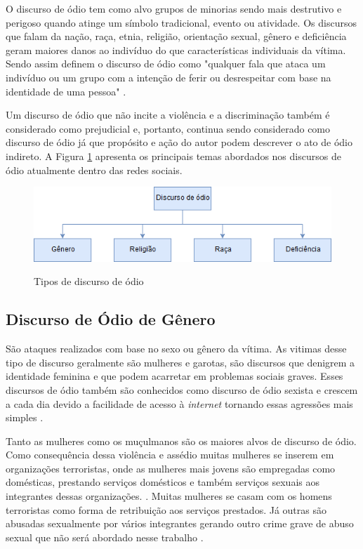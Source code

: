 O discurso de ódio tem como alvo grupos de minorias sendo mais destrutivo e perigoso quando atinge um símbolo tradicional, evento ou atividade. Os discursos que falam da nação, raça, etnia, religião, orientação sexual, gênero e deficiência geram maiores danos ao indivíduo do que características individuais da vítima. Sendo assim  definem o discurso de ódio como "qualquer fala que ataca um indivíduo ou um grupo com a intenção de ferir ou desrespeitar com base na identidade de uma pessoa" \cite{Chetty2018}.

Um discurso de ódio que não incite a violência e a discriminação também é considerado como prejudicial e, portanto, continua sendo considerado como discurso de ódio já que propósito e ação do autor podem descrever o ato de ódio indireto. A Figura \ref{fig:tiposdediscursodeodio} apresenta os principais temas abordados nos discursos de ódio atualmente dentro das redes sociais.

\begin{figure}[!h]
\centering 
\caption{Tipos de discurso de ódio}
\includegraphics[scale=0.70]{imagens/tiposdediscursodeodio.png}
\label{fig:tiposdediscursodeodio}
\end{figure}

\subsection{Discurso de Ódio de Gênero}
São ataques realizados com base no sexo ou gênero da vítima. As vitimas desse tipo de discurso geralmente são mulheres e garotas, são discursos que denigrem a identidade feminina e que podem acarretar em problemas sociais graves. Esses discursos de ódio também são conhecidos como discurso de ódio sexista e crescem a cada dia devido a facilidade de acesso à \textit{internet} tornando essas agressões mais simples \cite{Chetty2018}.

Tanto as mulheres como os muçulmanos são os maiores alvos de discurso de ódio. Como consequência dessa violência e assédio muitas mulheres se inserem em organizações terroristas, onde as mulheres mais jovens são empregadas como domésticas, prestando serviços domésticos e também serviços sexuais aos integrantes dessas organizações. \cite{Edwards2016}. Muitas mulheres se casam com os homens terroristas como forma de retribuição aos serviços prestados. Já outras são abusadas sexualmente por vários integrantes gerando outro crime grave de abuso sexual que não será abordado nesse trabalho \cite{Edwards2016}.

